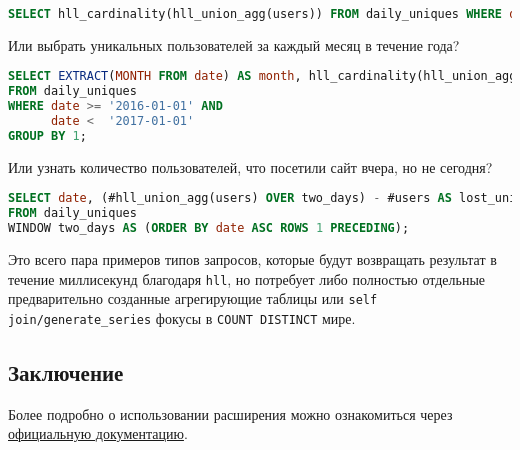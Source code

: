 \begin{lstlisting}[language=SQL,label=lst:pghll5,caption=daily\_uniques за неделю]
SELECT hll_cardinality(hll_union_agg(users)) FROM daily_uniques WHERE date >= '2017-02-20'::date AND date <= '2017-02-26'::date;
\end{lstlisting}

Или выбрать уникальных пользователей за каждый месяц в течение года?

\begin{lstlisting}[language=SQL,label=lst:pghll6,caption=daily\_uniques за каждый месяц]
SELECT EXTRACT(MONTH FROM date) AS month, hll_cardinality(hll_union_agg(users))
FROM daily_uniques
WHERE date >= '2016-01-01' AND
      date <  '2017-01-01'
GROUP BY 1;
\end{lstlisting}

Или узнать количество пользователей, что посетили сайт вчера, но не сегодня?

\begin{lstlisting}[language=SQL,label=lst:pghll7,caption=daily\_uniques за вчера но не сегодня]
SELECT date, (#hll_union_agg(users) OVER two_days) - #users AS lost_uniques
FROM daily_uniques
WINDOW two_days AS (ORDER BY date ASC ROWS 1 PRECEDING);
\end{lstlisting}

Это всего пара примеров типов запросов, которые будут возвращать результат в течение миллисекунд благодаря \lstinline!hll!, но потребует либо полностью отдельные предварительно созданные агрегирующие таблицы или \lstinline!self join/generate_series! фокусы в \lstinline!COUNT DISTINCT! мире.

\subsection{Заключение}

Более подробно о использовании расширения можно ознакомиться через \href{https://github.com/aggregateknowledge/postgresql-hll/blob/master/README.markdown}{официальную документацию}.
